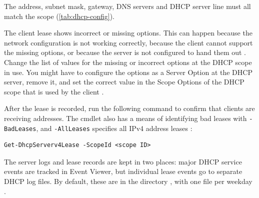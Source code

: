 
The address, subnet mask, gateway, DNS servers and DHCP server line must all match the scope (\autoref{tab:dhcp-config}).

{The client lease shows incorrect or missing options. This can happen because the network configuration is not working correctly, because the client cannot support the missing options, or because the server is not configured to hand them out \cite{msft-dhcp-clients}.}
{Change the list of values for the missing or incorrect options at the DHCP scope in use. You might have to configure the options as a Server Option at the DHCP server, remove it, and set the correct value in the Scope Options of the DHCP scope that is used by the client \cite{msft-dhcp-clients}.}

After the lease is recorded, run the following command to confirm that clients are receiving addresses. The cmdlet also has a means of identifying bad leases with \texttt{-BadLeases}, and \texttt{-AllLeases} specifies all IPv4 address leases \cite{msft-get-lease}:

\begin{lstlisting}
Get-DhcpServerv4Lease -ScopeId <scope ID>
\end{lstlisting}

The server logs and lease records are kept in two places: major DHCP service events are tracked in Event Viewer, but individual lease events go to separate DHCP log files. By default, these are in the directory , with one file per weekday \cite{garn-dhcp-logs}.
